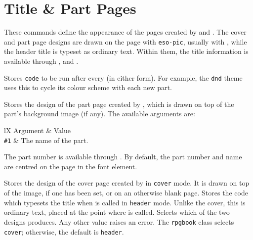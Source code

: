 	\section{Title \& Part Pages}\label{S:ThemeTitles}

		These commands define the appearance of the pages created by  and . The cover and part page designs are drawn on the page with \texttt{eso-pic}, usually with , while the header title is typeset as ordinary text. Within them, the title information is available through ,  and  .

		{
			Stores \texttt{code} to be run after every  (in either form). For example, the \texttt{dnd} theme uses this to cycle its colour scheme with each new part.
		}
		{
			Stores the design of the part page created by , which is drawn on top of the part's background image (if any). The available arguments are:
			\begin{RpgTable}{lX}
				Argument & Value
				\\
				\texttt{\#1} & The name of the part.
			\end{RpgTable}
			The part number is available through . By default, the part number and name are centred on the page in the  font element.
		}
		{
			Stores the design of the cover page created by  in \texttt{cover} mode. It is drawn on top of the  image, if one has been set, or on an otherwise blank page.
		}
		{
			Stores the code which typesets the title when  is called in \texttt{header} mode. Unlike the cover, this is ordinary text, placed at the point where  is called.
		}
		{
			Selects which of the two designs  produces. Any other value raises an error. The \texttt{rpgbook} class selects \texttt{cover}; otherwise, the default is \texttt{header}.
		}
